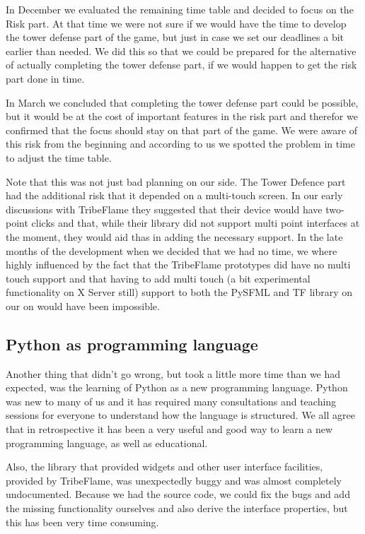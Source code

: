 \documentclass[12pt,a4paper]{article}
\begin{document}
In December we evaluated the remaining time table and decided to focus on the Risk part. At that time we were not sure if we would have the time to develop the tower defense part of the game, but just in case we set our deadlines a bit earlier than needed. We did this so that we could be prepared for the alternative of actually completing the tower defense part, if we would happen to get the risk part done in time. 

In March we concluded that completing the tower defense part could be
possible, but it would be at the cost of important features in the
risk part and therefor we confirmed that the focus should stay on that
part of the game. We were aware of this risk from the beginning and
according to us we spotted the problem in time to adjust the time
table.

Note that this was not just bad planning on our side. The Tower
Defence part had the additional risk that it depended on a multi-touch
screen. In our early discussions with TribeFlame they suggested that
their device would have two-point clicks and that, while their library
did not support multi point interfaces at the moment, they would aid
thas in adding the necessary support. In the late months of the
development when we decided that we had no time, we where highly
influenced by the fact that the TribeFlame prototypes did have no
multi touch support and that having to add multi touch (a bit
experimental functionality on X Server still) support to both the
PySFML and TF library on our on would have been impossible.

\subsection{Python as programming language}

Another thing that didn't go wrong, but took a little more time than
we had expected, was the learning of Python as a new programming
language. Python was new to many of us and it has required many
consultations and teaching sessions for everyone to understand how the
language is structured. We all agree that in retrospective it has been
a very useful and good way to learn a new programming language, as
well as educational.

Also, the library that provided widgets and other user interface
facilities, provided by TribeFlame, was unexpectedly buggy and was
almost completely undocumented. Because we had the source code, we
could fix the bugs and add the missing functionality ourselves and
also derive the interface properties, but this has been very time
consuming.
\end{document}

